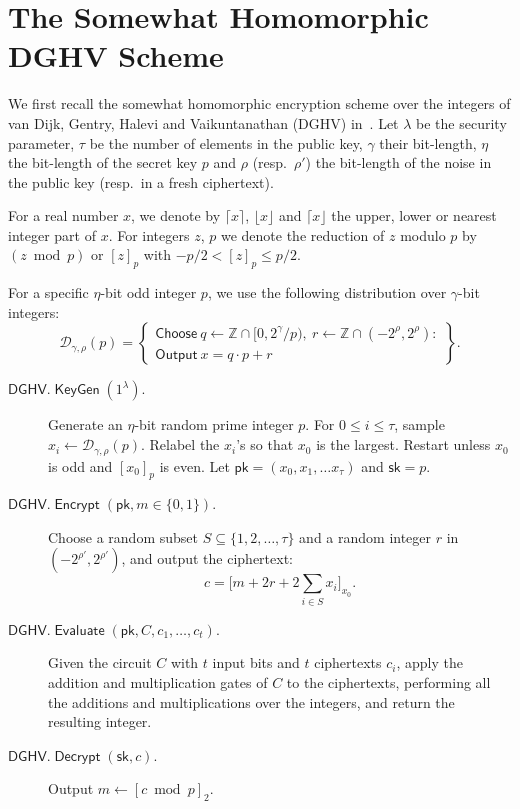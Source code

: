 \documentclass{llncs}
\renewcommand\leq\leqslant
\DeclareMathOperator{\KeyGen}{\ensuremath{\mathsf{KeyGen}}}
\DeclareMathOperator{\Encrypt}{\ensuremath{\mathsf{Encrypt}}}
\DeclareMathOperator{\Decrypt}{\ensuremath{\mathsf{Decrypt}}}
\DeclareMathOperator{\Evaluate}{\ensuremath{\mathsf{Evaluate}}}
\newcommand*\Choose{\ensuremath{\mathsf{Choose}\ }}
\newcommand*\Output{\ensuremath{\mathsf{Output}\ }}
\newcommand*{\pk}{\ensuremath{\mathsf{pk}}}
\newcommand*{\sk}{\ensuremath{\mathsf{sk}}}
\newcommand*{\DGHV}{\ensuremath{\mathsf{DGHV}}}
\begin{document}
\section{The Somewhat Homomorphic DGHV Scheme}
\label{sec:dghv}

We first recall the somewhat homomorphic encryption scheme
over the integers of van Dijk, Gentry, Halevi and
Vaikuntanathan (DGHV) in~\cite{vDGHV2010}. Let $\lambda$ be the
security parameter, $\tau$ be the number of elements in the public
key, $\gamma$ their bit-length, $\eta$
the bit-length of the secret key $p$ and $\rho$ (resp.\ $\rho'$) the
bit-length of the noise in the public key (resp.\ in a fresh
ciphertext). 

For a real number
$x$, we denote by $\lceil x \rceil$, $\lfloor x \rfloor$ and $\lceil x
\rfloor$ the upper, lower or nearest integer part of $x$. For
integers $z$, $p$ we denote the reduction of $z$ modulo $p$ by
$(z\bmod p)$ or $[z]_p$ with $-p/2 < [z]_p \leq p/2$. 

For a specific $\eta$-bit odd integer $p$, we use the following distribution over $\gamma$-bit integers:
\[ \mathcal{D}_{\gamma,\rho}(p) = \left\{ \begin{array}{c}\Choose q \leftarrow \mathbb{Z} \cap [0,2^\gamma/p),~
r \leftarrow \mathbb{Z} \cap (-2^\rho,2^\rho) :\\ \Output x =
q \cdot p + r \end{array}\right\}. \]

\begin{description}
\item[$\DGHV.\KeyGen(1^\lambda)$.] Generate an $\eta$-bit random prime integer $p$. For $0 \leq i \leq \tau$, sample $
x_i \leftarrow \mathcal{D}_{\gamma,\rho}(p) $. Relabel the $x_i$'s  so
that $x_0$ is the largest. Restart unless $x_0$ is odd and $[x_0]_p$
is even. Let $\pk=(x_0,x_1,\ldots x_\tau)$ and $\sk=p$.
\\\vspace{-0.25cm}
\item[$\DGHV.\Encrypt(\pk, m \in \{0,1\})$.] Choose a random subset $S \subseteq
\{1,2,\ldots,\tau\}$ and a random integer $r$ in
$(-2^{\rho'}, 2^{\rho'})$, and output the ciphertext:
\begin{equation}
\label{eq:DGHV}
 c = \bigg[ m+2r+2 \sum\limits_{i \in S} x_i \bigg]_{x_0}.
\end{equation}
\vspace{-0.25cm}
\item[$\DGHV.\Evaluate(\pk, C, c_1, \ldots, c_t)$.] Given the circuit
$C$ with $t$ input bits and $t$ ciphertexts $c_i$, apply the addition
and multiplication gates of $C$ to the ciphertexts, performing all the
additions and multiplications over the integers, and return the
resulting integer.
\\\vspace{-0.25cm}
\item[$\DGHV.\Decrypt(\sk, c)$.] Output $m \leftarrow [c \bmod p]_2$.
\end{description}
\end{document}
